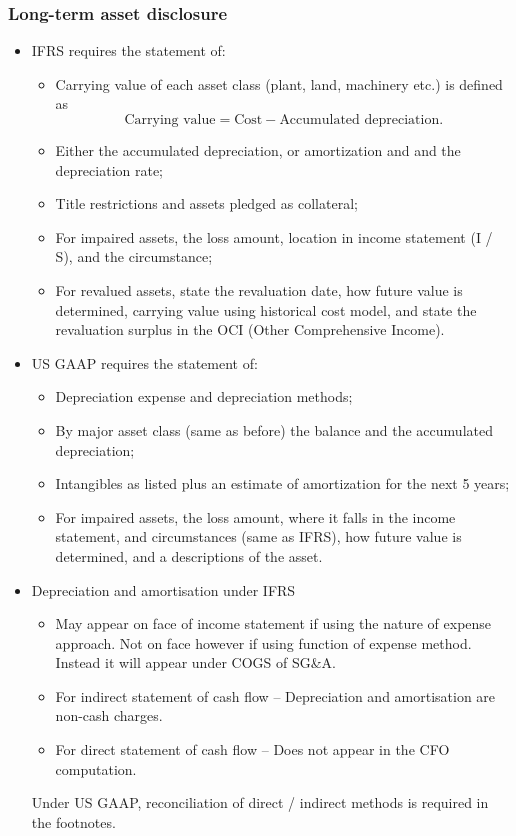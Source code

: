 \documentclass[../notes_compiled.tex]{subfiles}
\begin{document}
\begin{itemize}
\subsubsection{Long-term asset disclosure}
\begin{itemize}
\item IFRS requires the statement of:
\begin{itemize}
\item Carrying value of each asset class (plant, land, machinery etc.) is defined as 
\begin{equation}
\text{Carrying value} = \text{Cost} - \text{Accumulated depreciation}.
\end{equation}
\item Either the accumulated depreciation, or amortization and and the depreciation rate;
\item Title restrictions and assets pledged as collateral;
\item For impaired assets, the loss amount, location in income statement (I / S), and the circumstance;
\item For revalued assets, state the revaluation date, how future value is determined, carrying value using historical cost model, and state the revaluation surplus in the OCI (Other Comprehensive Income).
\end{itemize}

\item US GAAP requires the statement of:
\begin{itemize}
\item Depreciation expense and depreciation methods;
\item By major asset class (same as before) the balance and the accumulated depreciation;
\item Intangibles as listed plus an estimate of amortization for the next 5 years;
\item For impaired assets, the loss amount, where it falls in the income statement, and circumstances (same as IFRS), how future value is determined, and a descriptions of the asset.
\end{itemize}

\item Depreciation and amortisation under IFRS
\begin{itemize}
\item May appear on face of income statement if using the nature of expense approach. Not on face however if using function of expense method. Instead it will appear under COGS of SG\&A.
\item For indirect statement of cash flow -- Depreciation and amortisation are non-cash charges.
\item For direct statement of cash flow -- Does not appear in the CFO computation.
\end{itemize}
Under US GAAP, reconciliation of direct / indirect methods is required in the footnotes.
\end{itemize}

\end{itemize}
\end{document}
